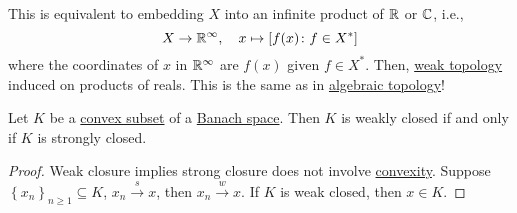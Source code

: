 \begin{remark}
	This is equivalent to embedding \(X\) into an infinite product of \(\mathbb{\MakeUppercase{r}} \) or \(\mathbb{\MakeUppercase{c}} \), i.e.,
	\[
		X\to \mathbb{\MakeUppercase{r}} ^{\infty} ,\quad x\mapsto \left[ f(x)\colon f\in X^{\ast} \right]
	\]
	where the coordinates of \(x\) in \(\mathbb{\MakeUppercase{r}} ^{\infty} \) are \(f(x)\) given \(f\in X^{\ast} \). Then, \hyperref[def:weak-topology]{weak topology} induced on products of reals. This is the same as in \href{https://www.pbb.wtf/posts/Notes#algebraic-topology-math592-umich}{algebraic topology}!
\end{remark}

\begin{proposition}\label{prop:weak-closedness}
	Let \(K\) be a \hyperref[def:convex-set]{convex subset} of a \hyperref[def:Banach-space]{Banach space}. Then \(K\) is weakly closed if and only if \(K\) is strongly closed.
\end{proposition}
\begin{proof}
	Weak closure implies strong closure does not involve \hyperref[def:convex-set]{convexity}. Suppose \(\left\{ x_n \right\} _{n\geq 1}\subseteq K\), \(x_n \overset{s}{\to } x\), then \(x_n \overset{w}{\to } x\). If \(K\) is weak closed, then \(x\in K\).
\end{proof}